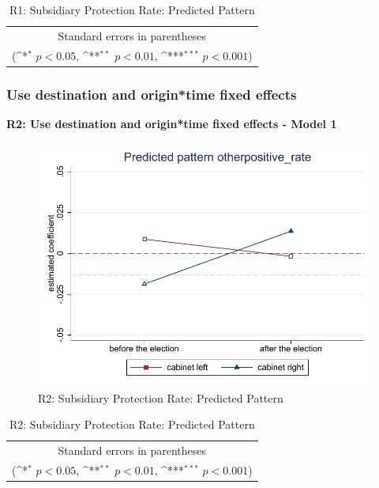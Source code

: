 \documentclass[10pt,a4paper]{scrartcl}
\begin{document}
\begin{table}[!ht]\centering
	\footnotesize
	\renewcommand{\arraystretch}{1.2}
	\def\sym#1{\ifmmode^{#1}\else\(^{#1}\)\fi}
	\caption{R1: Subsidiary Protection Rate: Predicted Pattern}
	\begin{tabular}{l*{2}{c}}
		\hline\hline
		
		\hline\hline
		\multicolumn{3}{c}{\footnotesize Standard errors in parentheses} \\
		\multicolumn{3}{c}{\footnotesize (\sym{*} \(p<0.05\), \sym{**} \(p<0.01\), \sym{***} \(p<0.001\))}\\
	\end{tabular}
\end{table}


\FloatBarrier
\clearpage
\subsubsection{Use destination and origin*time fixed effects}
\textbf{R2: Use destination and origin*time fixed effects - Model 1}

\begin{figure}[!ht]
	\centering
	\includegraphics[width=1\textwidth]{figures_edited/otherpositive_rate_graph1_R2.pdf}
	\caption{R2: Subsidiary Protection Rate: Predicted Pattern}
\end{figure}

\begin{table}[!ht]\centering
	\renewcommand{\arraystretch}{1.25}
	\def\sym#1{\ifmmode^{#1}\else\(^{#1}\)\fi}
	\caption{R2: Subsidiary Protection Rate: Predicted Pattern}
	\begin{tabular}{l*{2}{c}}
		\hline\hline
		
		\hline\hline
		\multicolumn{3}{c}{\footnotesize Standard errors in parentheses} \\
		\multicolumn{3}{c}{\footnotesize (\sym{*} \(p<0.05\), \sym{**} \(p<0.01\), \sym{***} \(p<0.001\))}\\
	\end{tabular}
\end{table}
\end{document}
